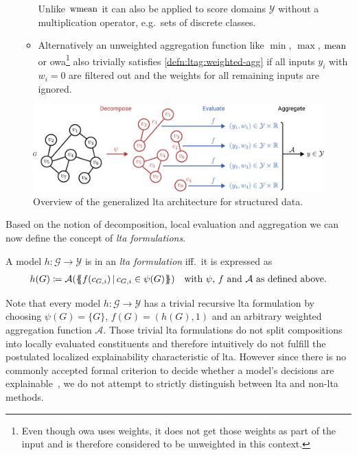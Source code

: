 \begin{enumerate}[label=\textbf{\arabic*.}]
\begin{itemize}
				Unlike $\operatorname{wmean}$ it can also be applied to score domains $\mathcal{Y}$ without a multiplication operator, e.g.\ sets of discrete classes.
			\item Alternatively an unweighted aggregation function like $\min$, $\max$, $\operatorname{mean}$ or \ac{owa}\footnote{
				Even though \ac{owa} uses weights, it does not get those weights as part of the input and is therefore considered to be unweighted in this context.
			} also trivially satisfies \cref{defn:ltag:weighted-agg} if all inputs $y_i$ with $w_i = 0$ are filtered out and the weights for all remaining inputs are ignored.
		\end{itemize}
\end{enumerate}
\begin{figure}[ht]
	\centering
	\includegraphics[width=\linewidth]{gfx/graph-lta/ltag-overview.pdf}
	\caption{
		Overview of the generalized \ac{lta} architecture for structured data.
	}\label{fig:ltag:ltag-overview}
\end{figure}
Based on the notion of decomposition, local evaluation and aggregation we can now define the concept of \textit{\ac{lta} formulations}.
\begin{defn}
	A model $h: \mathcal{G} \to \mathcal{Y}$ is in an \textit{\ac{lta} formulation} iff.\ it is expressed as
	\begin{align*}
		h(G) \coloneqq \mathcal{A}(\ldblbrace f(c_{G,i})\, |\, c_{G,i} \in \psi(G) \rdblbrace) \quad\text{with $\psi$, $f$ and $\mathcal{A}$ as defined above.}
	\end{align*}
\end{defn}
Note that every model $h: \mathcal{G} \to \mathcal{Y}$ has a trivial recursive \ac{lta} formulation by choosing $\psi(G) = \{ G \}$, $f(G) = (h(G), 1)$ and an arbitrary weighted aggregation function $\mathcal{A}$.
Those trivial \ac{lta} formulations do not split compositions into locally evaluated constituents and therefore intuitively do not fulfill the postulated localized explainability characteristic of \ac{lta}.
However since there is no commonly accepted formal criterion to decide whether a model's decisions are explainable~\cite{Lipton2018}, we do not attempt to strictly distinguish between \ac{lta} and non-\acs{lta} methods.
